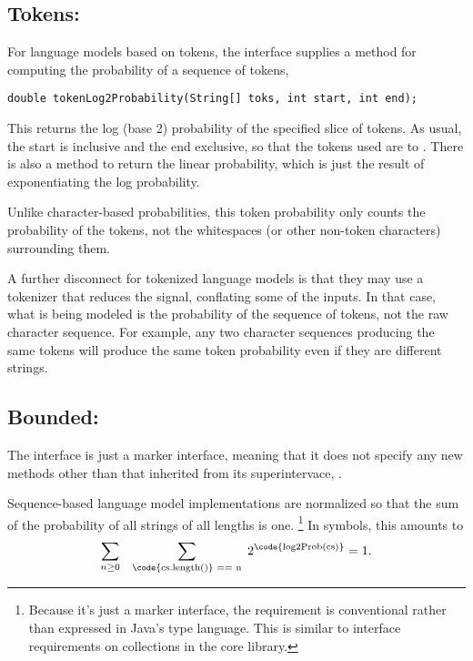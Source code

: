 \subsection{Tokens: }

For language models based on tokens, the interface
 supplies a method for
computing the probability of a sequence of tokens,
%
\begin{verbatim}
double tokenLog2Probability(String[] toks, int start, int end);
\end{verbatim}
%
This returns the log (base 2) probability of the specified slice of
tokens.  As usual, the start is inclusive and the end exclusive, so
that the tokens used are  to .
There is also a method to return the linear probability, which is just
the result of exponentiating the log probability.  

Unlike character-based probabilities, this token probability only
counts the probability of the tokens, not the whitespaces (or other
non-token characters) surrounding them.  

A further disconnect for tokenized language models is that they may
use a tokenizer that reduces the signal, conflating some of the
inputs.  In that case, what is being modeled is the probability of
the sequence of tokens, not the raw character sequence.  For example,
any two character sequences producing the same tokens will produce
the same token probability even if they are different strings.

\subsection{Bounded: }

The interface  is just a marker
interface, meaning that it does not specify any new methods other than
that inherited from its superintervace, .

Sequence-based language model implementations are normalized so
that the sum of the probability of all strings of all lengths is one.%
%
\footnote{Because it's just a marker interface, the requirement is
  conventional rather than expressed in Java's type language.  This is
  similar to interface requirements on collections in the
   core library.}
%
In symbols, this amounts to
%
\begin{equation}
\sum_{n \geq 0} \hspace*{8pt} \sum_{\text{\code{cs.length()} == n}} \hspace*{3pt} 2^{\text{\code{log2Prob(cs)}}} = 1.
\end{equation}

